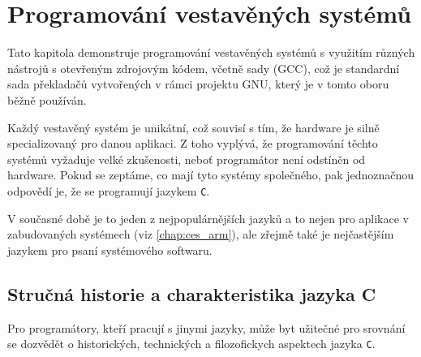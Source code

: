 \setchaptertoc
\chapter{Programování vestavěných systémů}\label{ces:C_chapI}

  Tato kapitola demonstruje programování vestavěných systémů s využitím různých nástrojů s 
  otevřeným zdrojovým kódem, včetně sady \wikiGCC (GCC), což je standardní sada překladačů 
  vytvořených v rámci projektu GNU, který je v tomto oboru běžně používán. 
  
  
  Každý vestavěný systém je unikátní, což souvisí s tím, že hardware je silně specializovaný pro 
  danou aplikaci. Z toho vyplývá, že programování těchto systémů vyžaduje velké zkušenosti, neboť 
  programátor není odstíněn od hardware. Pokud se zeptáme, co mají tyto systémy společného, pak 
  jednoznačnou odpovědí je, že se programují jazykem \texttt{C}.
  
  V současné době je to jeden z nejpopulárnějších jazyků a to nejen pro aplikace v zabudovaných 
  systémech (viz \ref{chap:ces_arm}), ale zřejmě také je nejčastějším jazykem pro psaní systémového 
  softwaru.
  
  \section{Stručná historie a charakteristika jazyka  C}\label{ces:C_chapIsecI}
     Pro programátory, kteří pracují s jinymi jazyky, může byt užitečné pro srovnání se dozvědět o 
     historických, technických a filozofickych aspektech jazyka \texttt{C}. 
     
